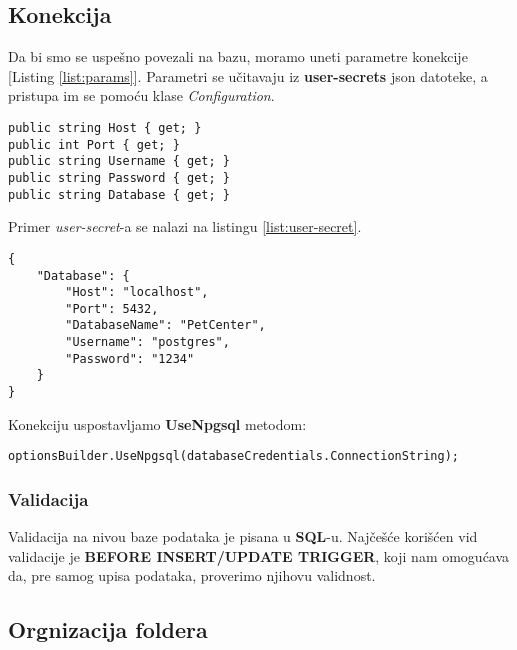 \subsection*{Konekcija}
\par Da bi smo se uspešno povezali na bazu, moramo uneti parametre konekcije [Listing \ref{list:params}]. Parametri se učitavaju iz
\textbf{user-secrets} json datoteke, a pristupa im se pomoću klase \textit{Configuration}.
\begin{lstlisting}[caption={Parametri konekcije}, captionpos=b, label={list:params}]
public string Host { get; }
public int Port { get; }
public string Username { get; }
public string Password { get; }
public string Database { get; }
\end{lstlisting}
\par Primer \textit{user-secret}-a se nalazi na listingu \ref{list:user-secret}.
\begin{lstlisting}[caption={Primer \textit{user-secret}}, captionpos=b, label={list:user-secret}]
{
    "Database": {
        "Host": "localhost",
        "Port": 5432,
        "DatabaseName": "PetCenter",
        "Username": "postgres",
        "Password": "1234"
    }
}
\end{lstlisting}
\par Konekciju uspostavljamo \textbf{UseNpgsql} metodom:
\begin{lstlisting}[caption={Uspostavljanje konekcije}, captionpos=b]
optionsBuilder.UseNpgsql(databaseCredentials.ConnectionString);
\end{lstlisting}
\subsubsection*{Validacija}
\par Validacija na nivou baze podataka je pisana u \textbf{SQL}-u. Najčešće korišćen
vid validacije je \textbf{BEFORE INSERT/UPDATE TRIGGER}, koji nam omogućava da, pre samog upisa podataka, proverimo njihovu validnost.
\subsection{Orgnizacija foldera}